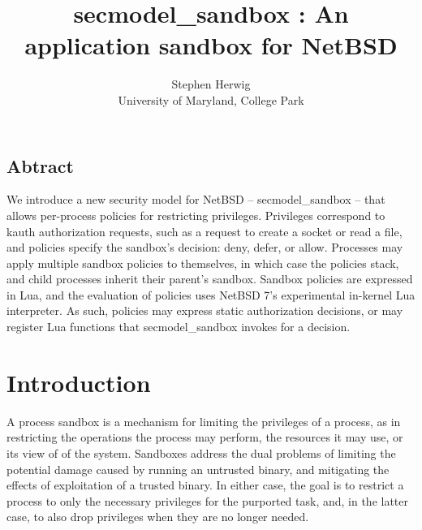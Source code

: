 \documentclass[letterpaper,twocolumn,9pt]{article}
\begin{document}
\date{}

\title{\bf secmodel\_sandbox : An application sandbox for NetBSD}

\author{
{\rm Stephen Herwig} \\
University of Maryland, College Park
} %

\maketitle

\thispagestyle{empty}

%


\subsection*{Abtract}
We introduce a new security model for NetBSD -- secmodel\_sandbox -- that
allows per-process policies for restricting privileges.   Privileges correspond to
kauth authorization requests, such as a request to create a socket or read a
file, and policies specify the sandbox's decision: deny, defer, or allow.
Processes may apply multiple sandbox policies to themselves, in which case the
policies stack, and child processes inherit their parent's sandbox.  Sandbox
policies are expressed in Lua, and the evaluation of policies uses NetBSD 7's
experimental in-kernel Lua interpreter.  As such, policies may express static
authorization decisions, or may register Lua functions that secmodel\_sandbox
invokes for a decision.

\section{Introduction}
A process sandbox is a mechanism for limiting the privileges of a process, as
in restricting the operations the process may perform, the resources it may
use, or its view of of the system.  Sandboxes address the dual problems of
limiting the potential damage caused by running an untrusted binary, and
mitigating the effects of exploitation of a trusted binary.  In either case,
the goal is to restrict a process to only the necessary privileges for the
purported task, and, in the latter case, to also drop privileges when they are
no longer needed.
\end{document}
